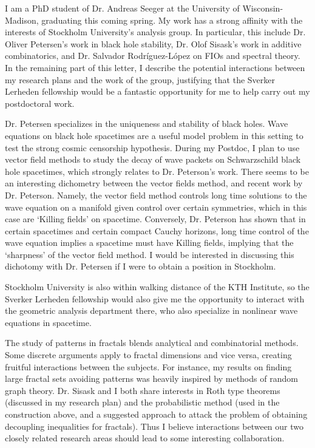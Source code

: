 \documentclass[11pt,stdletter,orderfromtodate,sigleft]{newlfm}
\begin{document}
\begin{newlfm}

I am a PhD student of Dr. Andreas Seeger at the University of Wisconsin-Madison, graduating this coming spring. My work has a strong affinity with the interests of Stockholm University's analysis group. In particular, this include Dr. Oliver Petersen's work in black hole stability, Dr. Olof Sisask's work in additive combinatorics, and Dr. Salvador Rodr\'{i}guez-L\'{o}pez on FIOs and spectral theory. In the remaining part of this letter, I describe the potential interactions between my research plans and the work of the group, justifying that the Sverker Lerheden fellowship would be a fantastic opportunity for me to help carry out my postdoctoral work.

Dr. Petersen specializes in the uniqueness and stability of black holes. Wave equations on black hole spacetimes are a useful model problem in this setting to test the strong cosmic censorship hypothesis. During my Postdoc, I plan to use vector field methods to study the decay of wave packets on Schwarzschild black hole spacetimes, which strongly relates to Dr. Peterson's work. There seems to be an interesting dichometry between the vector fields method, and recent work by Dr. Peterson. Namely, the vector field method controls long time solutions to the wave equation on a manifold given control over certain symmetries, which in this case are `Killing fields' on spacetime. Conversely, Dr. Peterson has shown that in certain spacetimes and certain compact Cauchy horizons, long time control of the wave equation implies a spacetime must have Killing fields, implying that the `sharpness' of the vector field method. I would be interested in discussing this dichotomy with Dr. Petersen if I were to obtain a position in Stockholm.

Stockholm University is also within walking distance of the KTH Institute, so the Sverker Lerheden fellowship would also give me the opportunity to interact with the geometric analysis department there, who also specialize in nonlinear wave equations in spacetime.

The study of patterns in fractals blends analytical and combinatorial methods. Some discrete arguments apply to fractal dimensions and vice versa, creating fruitful interactions between the subjects. For instance, my results on finding large fractal sets avoiding patterns was heavily inspired by methods of random graph theory. Dr. Sisask and I both share interests in Roth type theorems (discussed in my research plan) and the probabilistic method (used in the construction above, and a suggested approach to attack the problem of obtaining decoupling inequalities for fractals). Thus I believe interactions between our two closely related research areas should lead to some interesting collaboration.


\end{newlfm}
\end{document}
